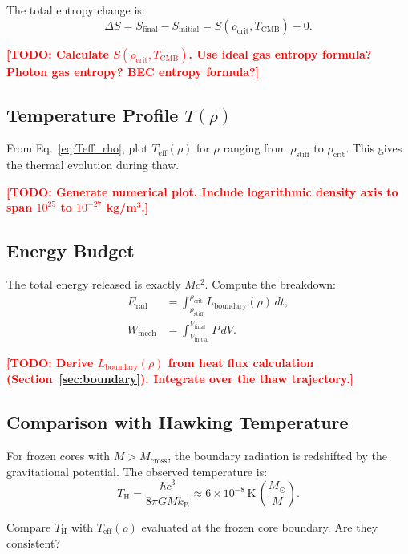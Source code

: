\documentclass[11pt,a4paper]{article}
\newcommand{\kB}{\ensuremath{k_{\mathrm{B}}}}
\newcommand{\rhocrit}{\ensuremath{\rho_{\mathrm{crit}}}}
\newcommand{\rhostiff}{\ensuremath{\rho_{\mathrm{stiff}}}}
\newcommand{\Teff}{\ensuremath{T_{\mathrm{eff}}}}
\newcommand{\TCMB}{\ensuremath{T_{\mathrm{CMB}}}}
\newcommand{\Mcross}{\ensuremath{M_{\mathrm{cross}}}}
\newcommand{\TH}{\ensuremath{T_{\mathrm{H}}}}
\newcommand{\TODO}[1]{\textcolor{red}{\textbf{[TODO: #1]}}}
\theoremstyle{definition}
\theoremstyle{remark}
\begin{document}
The total entropy change is:
\begin{equation}
\Delta S = S_{\mathrm{final}} - S_{\mathrm{initial}} = S(\rhocrit, \TCMB) - 0.
\end{equation}

\TODO{Calculate $S(\rhocrit, \TCMB)$. Use ideal gas entropy formula? Photon gas entropy? BEC entropy formula?}

\subsection{Temperature Profile $T(\rho)$}
\label{sec:T_rho_profile}

From Eq.~\ref{eq:Teff_rho}, plot $\Teff(\rho)$ for $\rho$ ranging from $\rhostiff$ to $\rhocrit$. This gives the thermal evolution during thaw.

\TODO{Generate numerical plot. Include logarithmic density axis to span $10^{25}$ to $10^{-27}$ kg/m$^3$.}

\subsection{Energy Budget}
\label{sec:energy_budget}

The total energy released is exactly $Mc^2$. Compute the breakdown:
\begin{align}
E_{\mathrm{rad}} &= \int_{\rhostiff}^{\rhocrit} L_{\mathrm{boundary}}(\rho) \, dt, \\
W_{\mathrm{mech}} &= \int_{V_{\mathrm{initial}}}^{V_{\mathrm{final}}} P \, dV.
\end{align}

\TODO{Derive $L_{\mathrm{boundary}}(\rho)$ from heat flux calculation (Section~\ref{sec:boundary}). Integrate over the thaw trajectory.}

\subsection{Comparison with Hawking Temperature}
\label{sec:hawking_comparison}

For frozen cores with $M > \Mcross$, the boundary radiation is redshifted by the gravitational potential. The observed temperature is:
\begin{equation}
\TH = \frac{\hbar c^3}{8\pi G M \kB} \approx 6 \times 10^{-8} \, \text{K} \, \left( \frac{M_\odot}{M} \right).
\end{equation}

Compare $\TH$ with $\Teff(\rho)$ evaluated at the frozen core boundary. Are they consistent?
\end{document}
